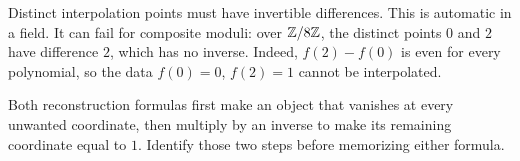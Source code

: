 \begin{warningbox}
Distinct interpolation points must have invertible differences.
This is automatic in a field. It can fail for composite moduli:
over $\mathbb Z/8\mathbb Z$, the distinct points $0$ and $2$ have difference $2$,
which has no inverse. Indeed, $f(2)-f(0)$ is even for every polynomial,
so the data $f(0)=0$, $f(2)=1$ cannot be interpolated.
\end{warningbox}

\begin{checkpoint}
Both reconstruction formulas first make an object that vanishes at every
unwanted coordinate, then multiply by an inverse to make its remaining
coordinate equal to $1$. Identify those two steps before memorizing either
formula.
\end{checkpoint}
